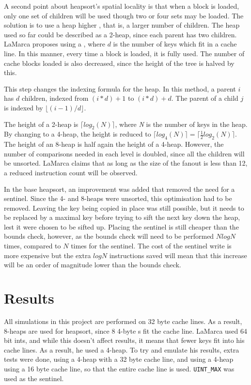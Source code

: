 A second point about heapsort's spatial locality is that when a block is loaded,
only one set of children will be used though two or four sets may be loaded. The
solution is to use a heap higher , that is, a larger number of
children.  The heap used so far could be described as a 2-heap, since each
parent has two children.  LaMarca proposes using a , where $d$ is the
number of keys which fit in a cache line. In this manner, every time a block is
loaded, it is fully used. The number of cache blocks loaded is also decreased,
since the height of the tree is halved by this.

This step changes the indexing formula for the heap. In this method, a parent
$i$ has $d$ children, indexed from $(i*d) + 1$ to $(i*d) + d$. The parent of a
child $j$ is indexed by $\lfloor{}(i-1)/d\rfloor{}$.

The height of a 2-heap is $\lceil{}log_2(N)\rceil{}$, where \textit{N} is the
number of keys in the heap. By changing to a 4-heap, the height is reduced to
$\lceil{}log_4(N)\rceil{} = \lceil{}\tfrac{1}{2}log_2(N)\rceil{}$. The height of
an 8-heap is half again the height of a 4-heap. However, the number of
comparisons needed in each level is doubled, since all the children will be
unsorted. LaMarca claims that as long as the size of the fanout is less than
12, a reduced instruction count will be observed.

In the base heapsort, an improvement was added that removed the need for a
sentinel. Since the 4- and 8-heaps were unsorted, this optimisation had to be
removed. Leaving the key being copied in place was still possible, but it needs
to be replaced by a maximal key before trying to sift the next key down the
heap, lest it were chosen to be sifted up. Placing the sentinel is still cheaper
than the bounds check, however, as the bounds check will need to be performed
$NlogN$ times, compared to $N$ times for the sentinel. The cost of the sentinel
write is more expensive but the extra $logN$ instructions saved will mean that
this increase will be an order of magnitude lower than the bounds check.


\section{Results}
All simulations in this project are performed on 32 byte cache lines. As a
result, 8-heaps are used for heapsort, since 8 4-byte s fit the cache line.
LaMarca used 64 bit ints, and while this doesn't affect results, it means that
fewer keys fit into his cache lines. As a result, he used a 4-heap. To try and
emulate his results, extra tests were done, using a 4-heap with a 32 byte
cache line, and using a 4-heap using a 16 byte cache line, so that the entire
cache line is used. \verb!UINT_MAX! was used as the sentinel.

